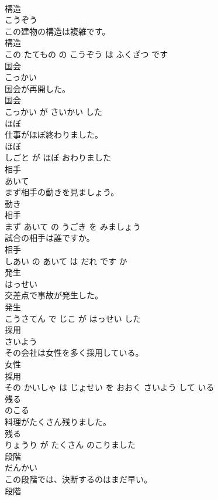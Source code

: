 \documentclass[8pt]{extreport}
\begin{document}
\begin{CJK}{UTF8}{min}
\\	構造	
\\	こうぞう			
\\	この建物の構造は複雑です。	
\\	構造 
\\	この たてもの の こうぞう は ふくざつ です			
\\	国会	
\\	こっかい			
\\	国会が再開した。	
\\	国会 
\\	こっかい が さいかい した			
\\	ほぼ	
\\	仕事がほぼ終わりました。	
\\	ほぼ 
\\	しごと が ほぼ おわりました			
\\	相手	
\\	あいて			
\\	まず相手の動きを見ましょう。	
\\	動き 
\\	相手 
\\	まず あいて の うごき を みましょう			
\\	試合の相手は誰ですか。	
\\	相手 
\\	しあい の あいて は だれ です か			
\\	発生	
\\	はっせい			
\\	交差点で事故が発生した。	
\\	発生 
\\	こうさてん で じこ が はっせい した			
\\	採用	
\\	さいよう			
\\	その会社は女性を多く採用している。	
\\	女性 
\\	採用 
\\	その かいしゃ は じょせい を おおく さいよう して いる			
\\	残る	
\\	のこる			
\\	料理がたくさん残りました。	
\\	残る 
\\	りょうり が たくさん のこりました			
\\	段階	
\\	だんかい			
\\	この段階では、決断するのはまだ早い。	
\\	段階 

\end{CJK}
\end{document}

